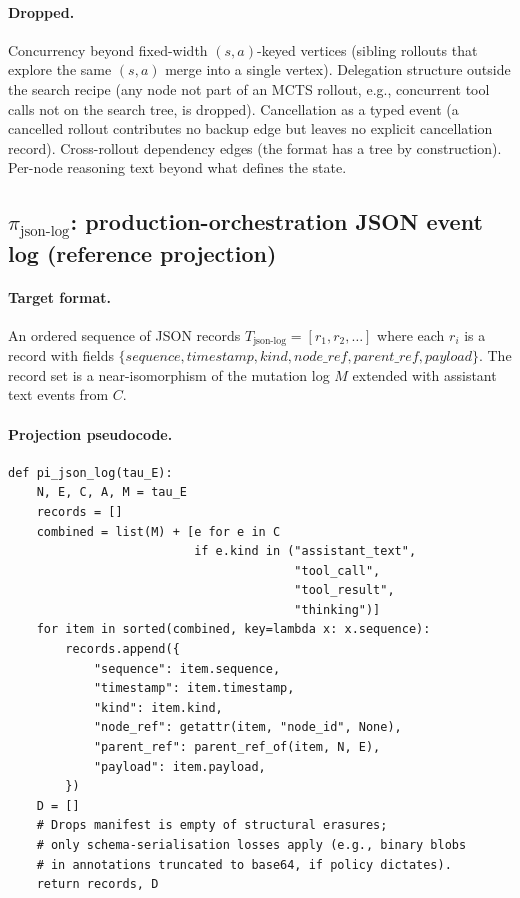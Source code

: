 \documentclass{article}
\begin{document}
\paragraph{Dropped.} Concurrency beyond fixed-width
$(s, a)$-keyed vertices (sibling rollouts that explore the same
$(s, a)$ merge into a single vertex). Delegation structure
outside the search recipe (any node not part of an MCTS rollout,
e.g., concurrent tool calls not on the search tree, is dropped).
Cancellation as a typed event (a cancelled rollout contributes
no backup edge but leaves no explicit cancellation record).
Cross-rollout dependency edges (the format has a tree by
construction). Per-node reasoning text beyond what defines the
state.

\subsection{$\pi_{\text{json-log}}$: production-orchestration JSON event log (reference projection)}
\label{app:proj:json-log}

\paragraph{Target format.} An ordered sequence of JSON records
$T_{\text{json-log}} = [r_1, r_2, \ldots]$ where each $r_i$ is a
record with fields
$\{\textit{sequence}, \textit{timestamp}, \textit{kind},
\textit{node\_ref}, \textit{parent\_ref}, \textit{payload}\}$.
The record set is a near-isomorphism of the mutation log $M$
extended with assistant text events from $C$.

\paragraph{Projection pseudocode.}
\begin{lstlisting}
def pi_json_log(tau_E):
    N, E, C, A, M = tau_E
    records = []
    combined = list(M) + [e for e in C
                          if e.kind in ("assistant_text",
                                        "tool_call",
                                        "tool_result",
                                        "thinking")]
    for item in sorted(combined, key=lambda x: x.sequence):
        records.append({
            "sequence": item.sequence,
            "timestamp": item.timestamp,
            "kind": item.kind,
            "node_ref": getattr(item, "node_id", None),
            "parent_ref": parent_ref_of(item, N, E),
            "payload": item.payload,
        })
    D = []
    # Drops manifest is empty of structural erasures;
    # only schema-serialisation losses apply (e.g., binary blobs
    # in annotations truncated to base64, if policy dictates).
    return records, D
\end{lstlisting}
\end{document}
